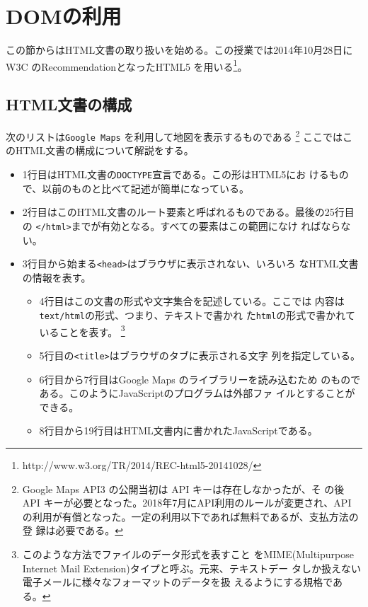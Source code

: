 \newcommand{\Elm}[1]{\texttt{<#1>}}
\newcommand{\Yes}{$\bigcirc$}
\newcommand{\No}{$\times$}
\chapter{DOMの利用}
この節からはHTML文書の取り扱いを始める。この授業では2014年10月28日にW3C
のRecommendationとなったHTML5
を用いる\footnote{http://www.w3.org/TR/2014/REC-html5-20141028/}。
\section{HTML文書の構成}
\begin{Exec}\upshape\label{ExGoogleMaps}
 次のリストは\texttt{Google Maps} を利用して地図を表示するものである
 \footnote{Google Maps API3 の公開当初は API キーは存在しなかったが、そ
 の後 API キーが必要となった。2018年7月にAPI利用のルールが変更され、API
 の利用が有償となった。一定の利用以下であれば無料であるが、支払方法の登
 録は必要である。}
ここではこのHTML文書の構成について解説をする。
\begin{itemize}
 \item 1行目はHTML文書の\texttt{DOCTYPE}宣言である。この形はHTML5にお
       けるもので、以前のものと比べて記述が簡単になっている。
 \item 2行目はこのHTML文書のルート要素と呼ばれるものである。最後の25行目
       の \Elm{/html}までが有効となる。すべての要素はこの範囲になけ
       ればならない。
 \item 3行目から始まる\Elm{head}はブラウザに表示されない、いろいろ
       なHTML文書の情報を表す。
         \begin{itemize}
	  \item 4行目はこの文書の形式や文字集合を記述している。ここでは
		内容は\texttt{text/html}の形式、つまり、テキストで書かれ
		た\texttt{html}の形式で書かれていることを表す。
		\footnote{このような方法でファイルのデータ形式を表すこと
		をMIME(Multipurpose
		Internet Mail Extension)タイプと呼ぶ。元来、テキストデー
		タしか扱えない電子メールに様々なフォーマットのデータを扱
		えるようにする規格である。}
	  \item 5行目の\Elm{title}はブラウザのタブに表示される文字
		列を指定している。
	  \item 6行目から7行目はGoogle Maps のライブラリーを読み込むため
		のものである。このようにJavaScriptのプログラムは外部ファ
		イルとすることができる。
	  \item 8行目から19行目はHTML文書内に書かれたJavaScriptである。

\end{itemize}
\end{itemize}
\end{Exec}
